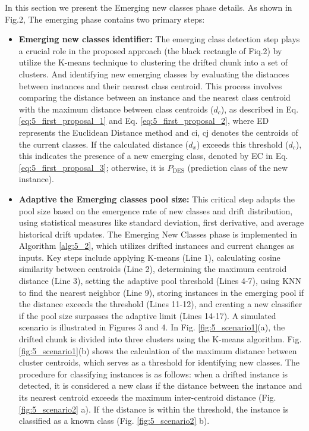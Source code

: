 In this section we present the Emerging new classes phase details. As shown in Fig.2, The emerging phase contains two primary steps: 
\begin{itemize}
	\item 	\textbf{Emerging new classes identifier:} The emerging class detection step plays a crucial role in the proposed approach (the black rectangle of Fiq.2) by utilize the K-means technique to clustering the drifted chunk into a set of clusters. And identifying new emerging classes by evaluating the distances between instances and their nearest class centroid. This process involves comparing the distance between an instance and the nearest class centroid with the maximum distance between class centroids ($d_c$), as described in Eq. \ref{eq:5_first_proposal_1} and Eq. \ref{eq:5_first_proposal_2}, where ED represents the Euclidean Distance method and ci, cj denotes the centroids of the current classes. If the calculated distance ($d_x$) exceeds this threshold ($d_c$), this indicates the presence of a new emerging class, denoted by EC in Eq. \ref{eq:5_first_proposal_3}; otherwise, it is $P_\text{DES}$ (prediction class of the new instance).
	\item \textbf{Adaptive the Emerging classes pool size:} This critical step adapts the pool size based on the emergence rate of new classes and drift distribution, using statistical measures like standard deviation, first derivative, and average historical drift updates.
	The Emerging New Classes phase is implemented in Algorithm  \ref{alg:5_2}, which utilizes drifted instances and current changes as inputs. Key steps include applying K-means (Line 1), calculating cosine similarity between centroids (Line 2), determining the maximum centroid distance (Line 3), setting the adaptive pool threshold (Lines 4-7), using KNN to find the nearest neighbor (Line 9), storing instances in the emerging pool if the distance exceeds the threshold (Lines 11-12), and creating a new classifier if the pool size surpasses the adaptive limit (Lines 14-17). A simulated scenario is illustrated in Figures 3 and 4. In Fig. \ref{fig:5_scenario1}(a), the drifted chunk is divided into three clusters using the K-means algorithm. Fig. \ref{fig:5_scenario1}(b) shows the calculation of the maximum distance between cluster centroids, which serves as a threshold for identifying new classes. The procedure for classifying instances is as follows: when a drifted instance is detected, it is considered a new class if the distance between the instance and its nearest centroid exceeds the maximum inter-centroid distance (Fig. \ref{fig:5_scenario2} a). If the distance is within the threshold, the instance is classified as a known class (Fig. \ref{fig:5_scenario2} b).
\end{itemize}

